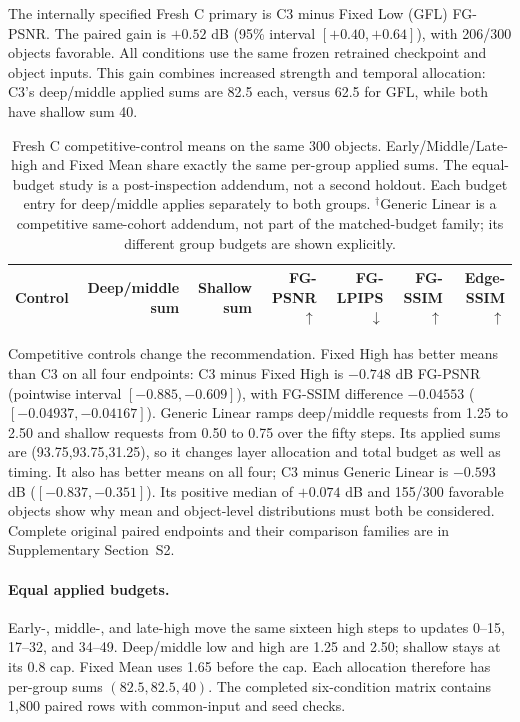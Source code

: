 \documentclass[times,twocolumn,final]{elsarticle}
\begin{document}
The internally specified Fresh C primary is C3 minus Fixed Low (GFL) FG-PSNR. The paired gain is $+0.52$ dB (95\% interval $[+0.40,+0.64]$), with 206/300 objects favorable. All conditions use the same frozen retrained checkpoint and object inputs. This gain combines increased strength and temporal allocation: C3's deep/middle applied sums are 82.5 each, versus 62.5 for GFL, while both have shallow sum 40.

\begin{table}[t]
\centering\scriptsize\setlength{\tabcolsep}{4pt}
\caption{Fresh C competitive-control means on the same 300 objects. Early/Middle/Late-high and Fixed Mean share exactly the same per-group applied sums. The equal-budget study is a post-inspection addendum, not a second holdout. Each budget entry for deep/middle applies separately to both groups. $^\dagger$Generic Linear is a competitive same-cohort addendum, not part of the matched-budget family; its different group budgets are shown explicitly.}
\label{tab:freshc-absolute}\label{tab:matched-budget300}
\begin{tabular}{lrrrrrr}
\toprule Control & Deep/middle sum & Shallow sum & FG-PSNR$\uparrow$ & FG-LPIPS$\downarrow$ & FG-SSIM$\uparrow$ & Edge-SSIM$\uparrow$ \\
\midrule

\bottomrule
\end{tabular}
\end{table}

Competitive controls change the recommendation. Fixed High has better means than C3 on all four endpoints: C3 minus Fixed High is $-0.748$ dB FG-PSNR (pointwise interval $[-0.885,-0.609]$), with FG-SSIM difference $-0.04553$ ($[-0.04937,-0.04167]$). Generic Linear ramps deep/middle requests from 1.25 to 2.50 and shallow requests from 0.50 to 0.75 over the fifty steps. Its applied sums are (93.75,93.75,31.25), so it changes layer allocation and total budget as well as timing. It also has better means on all four; C3 minus Generic Linear is $-0.593$ dB ($[-0.837,-0.351]$). Its positive median of $+0.074$ dB and 155/300 favorable objects show why mean and object-level distributions must both be considered. Complete original paired endpoints and their comparison families are in Supplementary Section~S2.

\paragraph{Equal applied budgets.}
\label{subsec:matched-budget300}
Early-, middle-, and late-high move the same sixteen high steps to updates 0--15, 17--32, and 34--49. Deep/middle low and high are 1.25 and 2.50; shallow stays at its 0.8 cap. Fixed Mean uses 1.65 before the cap. Each allocation therefore has per-group sums $(82.5,82.5,40)$. The completed six-condition matrix contains 1,800 paired rows with common-input and seed checks.
\end{document}
